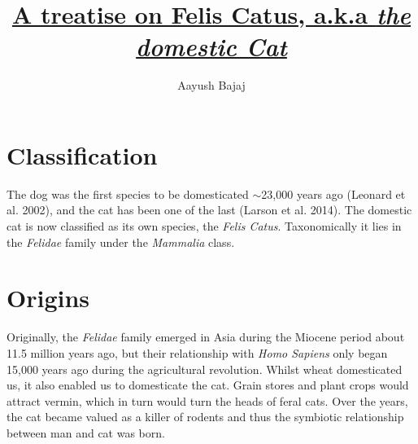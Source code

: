 \documentclass{article}
\title{\underline{A treatise on Felis Catus, a.k.a \emph{the domestic Cat}}}
\author{Aayush Bajaj}
\begin{document}
\maketitle{}

\pagestyle{fancy}
\dotfill

\section*{Classification}
The dog was the first species to be domesticated $\sim$23,000 years ago (Leonard et al. 2002), and the cat has been one of the last (Larson et al. 2014). The domestic cat is now classified as its own species, the \emph{Felis Catus}. Taxonomically it lies in the \emph{Felidae} family under the \emph{Mammalia} class.\\


\section*{Origins}
Originally, the \emph{Felidae} family emerged in Asia during the Miocene period about 11.5 million years ago, but their relationship with \emph{Homo Sapiens} only began 15,000 years ago during the agricultural revolution. Whilst wheat domesticated us, it also enabled us to domesticate the cat. Grain stores and plant crops would attract vermin, which in turn would turn the heads of feral cats. Over the years, the cat became valued as a killer of rodents and thus the symbiotic relationship between man and cat was born. 
\end{document}
